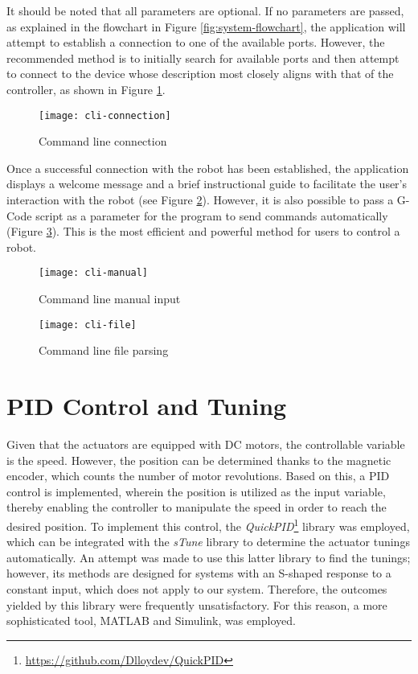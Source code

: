 It should be noted that all parameters are optional. If no parameters are passed, as explained in the flowchart in Figure \ref{fig:system-flowchart}, the application will attempt to establish a connection to one of the available ports. However, the recommended method is to initially search for available ports and then attempt to connect to the device whose description most closely aligns with that of the controller, as shown in Figure \ref{fig:cli-connection}.

\begin{figure}[H]
    \centering
    \texttt{[image: cli-connection]}
    \caption{Command line connection}
    \label{fig:cli-connection}
\end{figure}

Once a successful connection with the robot has been established, the application displays a welcome message and a brief instructional guide to facilitate the user's interaction with the robot (see Figure \ref{fig:cli-manual}). However, it is also possible to pass a G-Code script as a parameter for the program to send commands automatically (Figure \ref{fig:cli-file}). This is the most efficient and powerful method for users to control a robot.


\begin{figure}[H]
    \centering
    \texttt{[image: cli-manual]}
    \caption{Command line manual input}
    \label{fig:cli-manual}
\end{figure}

\begin{figure}[H]
    \centering
    \texttt{[image: cli-file]}
    \caption{Command line file parsing}
    \label{fig:cli-file}
\end{figure}

\section{PID Control and Tuning}

Given that the actuators are equipped with DC motors, the controllable variable is the speed. However, the position can be determined thanks to the magnetic encoder, which counts the number of motor revolutions. Based on this, a PID control is implemented, wherein the position is utilized as the input variable, thereby enabling the controller to manipulate the speed in order to reach the desired position. To implement this control, the \textit{QuickPID}\footnote{\url{https://github.com/Dlloydev/QuickPID}} library was employed, which can be integrated with the \textit{sTune} library to determine the actuator tunings automatically. An attempt was made to use this latter library to find the tunings; however, its methods are designed for systems with an S-shaped response to a constant input, which does not apply to our system. Therefore, the outcomes yielded by this library were frequently unsatisfactory. For this reason, a more sophisticated tool, MATLAB and Simulink, was employed.

